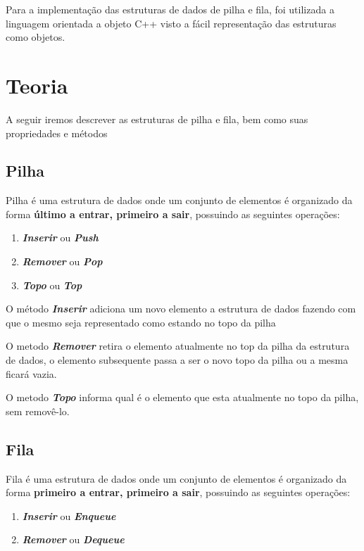 \documentclass[rascunho,xindy,sublist]{fei}
\begin{document}
Para a implementação das estruturas de dados de pilha e fila, foi utilizada a linguagem orientada a objeto C++ visto a fácil representação das estruturas como objetos.

\chapter{Teoria}

A seguir iremos descrever as estruturas de pilha e fila, bem como suas propriedades e métodos

\section{Pilha}

Pilha é uma estrutura de dados onde um conjunto de elementos é organizado da forma \textbf{último a entrar, primeiro a sair}, possuindo as seguintes operações:

\begin{enumerate}
  \item \textbf{\textit{Inserir}} ou \textbf{\textit{Push}}
  \item \textbf{\textit{Remover}} ou \textbf{\textit{Pop}}
  \item \textbf{\textit{Topo}} ou \textbf{\textit{Top}}
\end{enumerate}

O método \textbf{\textit{Inserir}} adiciona um novo elemento a estrutura de dados fazendo com que o mesmo seja representado como estando no topo da pilha

O metodo \textbf{\textit{Remover}} retira o elemento atualmente no top da pilha da estrutura de dados, o elemento subsequente passa a ser o novo topo da pilha ou a mesma ficará vazia.

O metodo \textbf{\textit{Topo}} informa qual é o elemento que esta atualmente no topo da pilha, sem removê-lo.

\section{Fila}

Fila é uma estrutura de dados onde um conjunto de elementos é organizado da forma \textbf{primeiro a entrar, primeiro a sair}, possuindo as seguintes operações:

\begin{enumerate}
  \item \textbf{\textit{Inserir}} ou \textbf{\textit{Enqueue}}
  \item \textbf{\textit{Remover}} ou \textbf{\textit{Dequeue}}
\end{enumerate}
\end{document}
